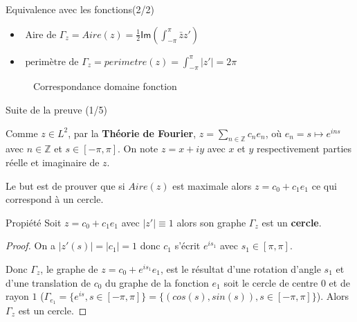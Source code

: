 \documentclass[11pt,envcountsect,aspectratio=169]{beamer} %
\newcommand{\Z}{\mathbb{Z}}
\renewcommand{\Im}{\mathsf{Im}}
\begin{document}
\begin{frame}{Equivalence avec les fonctions(2/2)}

    \begin{itemize}
        \item $\text{ Aire de $\Gamma_z$} = Aire(z)=\frac{1}{2}\Im\left(\int_{-\pi}^{\pi}{\bar{z}z'} \right)$
        \item $ \text{ perimètre de $\Gamma_z$} = perimetre(z) = \int_{-\pi}^{\pi}{|z'|} = 2\pi$
    \end{itemize}
    
    \begin{figure}
    \begin{center}
    \end{center}    
    \caption{Correspondance domaine fonction}
    \end{figure}

\end{frame}

\begin{frame}{Suite de la preuve (1/5)}

    Comme $z \in L^2$, par la \textbf{Théorie de Fourier}, $z = \sum_{n \in \Z}{c_n e_n}$, où $e_n=s \mapsto e^{ins}$ avec $n\in\Z$ et $s \in [-\pi,\pi]$. On note $z = x +i y$ avec $x$ et $y$ respectivement parties réelle et imaginaire de $z$.

    Le but est de prouver que si $Aire(z)$ est maximale alors $z = c_0 + c_1 e_1$ ce qui correspond à un cercle.
    
\begin{beamerboxesrounded}[upper=titreV,lower=texteV,shadow=true]{Propiété}
    Soit $z = c_0 + c_1 e_1$ avec $|z'| \equiv 1$ alors son graphe $\Gamma_z$ est un \textbf{cercle}.
\end{beamerboxesrounded}
    
    \begin{proof}
    On a $|z'(s)| = |c_1| = 1$ donc $c_1$ s'écrit $e^{is_1}$ avec $s_1 \in [\pi,\pi]$.
     
    Donc $\Gamma_z$, le graphe de $z = c_0 + e^{is_1} e_1$, est le résultat d'une rotation d'angle $s_1$ et d'une translation de $c_0$ du graphe de la fonction $e_1$ soit le cercle de centre $0$ et de rayon $1$ ($\Gamma_{e_1}=\{e^{is},s\in[-\pi,\pi]\}=\{(cos(s),sin(s)),s\in [-\pi,\pi]\}$). Alors $\Gamma_z$ est un cercle.
    \end{proof}
    
\end{frame}
\end{document}
